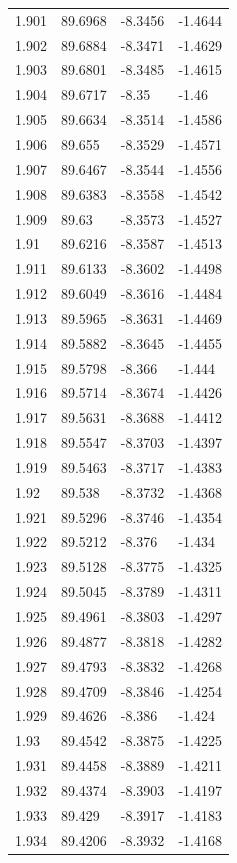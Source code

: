 \begin{tabular}{llll}
1.901 & 89.6968 & -8.3456 & -1.4644 \\
1.902 & 89.6884 & -8.3471 & -1.4629 \\
1.903 & 89.6801 & -8.3485 & -1.4615 \\
1.904 & 89.6717 & -8.35 & -1.46 \\
1.905 & 89.6634 & -8.3514 & -1.4586 \\
1.906 & 89.655 & -8.3529 & -1.4571 \\
1.907 & 89.6467 & -8.3544 & -1.4556 \\
1.908 & 89.6383 & -8.3558 & -1.4542 \\
1.909 & 89.63 & -8.3573 & -1.4527 \\
1.91 & 89.6216 & -8.3587 & -1.4513 \\
1.911 & 89.6133 & -8.3602 & -1.4498 \\
1.912 & 89.6049 & -8.3616 & -1.4484 \\
1.913 & 89.5965 & -8.3631 & -1.4469 \\
1.914 & 89.5882 & -8.3645 & -1.4455 \\
1.915 & 89.5798 & -8.366 & -1.444 \\
1.916 & 89.5714 & -8.3674 & -1.4426 \\
1.917 & 89.5631 & -8.3688 & -1.4412 \\
1.918 & 89.5547 & -8.3703 & -1.4397 \\
1.919 & 89.5463 & -8.3717 & -1.4383 \\
1.92 & 89.538 & -8.3732 & -1.4368 \\
1.921 & 89.5296 & -8.3746 & -1.4354 \\
1.922 & 89.5212 & -8.376 & -1.434 \\
1.923 & 89.5128 & -8.3775 & -1.4325 \\
1.924 & 89.5045 & -8.3789 & -1.4311 \\
1.925 & 89.4961 & -8.3803 & -1.4297 \\
1.926 & 89.4877 & -8.3818 & -1.4282 \\
1.927 & 89.4793 & -8.3832 & -1.4268 \\
1.928 & 89.4709 & -8.3846 & -1.4254 \\
1.929 & 89.4626 & -8.386 & -1.424 \\
1.93 & 89.4542 & -8.3875 & -1.4225 \\
1.931 & 89.4458 & -8.3889 & -1.4211 \\
1.932 & 89.4374 & -8.3903 & -1.4197 \\
1.933 & 89.429 & -8.3917 & -1.4183 \\
1.934 & 89.4206 & -8.3932 & -1.4168 \\

\end{tabular}

